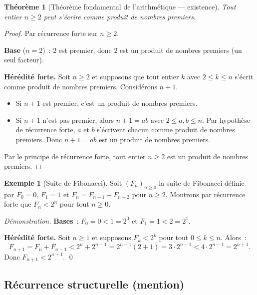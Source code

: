 \documentclass[12pt,a4paper,openany]{book}
\theoremstyle{definition}
\newtheorem{exemple}[definition]{Exemple}
\theoremstyle{plain}
\newtheorem{theoreme}[definition]{Théorème}
\theoremstyle{remark}
\begin{document}
\begin{theoreme}[Th\'eor\`eme fondamental de l'arithm\'etique --- existence]\label{thm:tfa-existence}
  Tout entier $n \geq 2$ peut s'\'ecrire comme produit de nombres premiers.
\end{theoreme}

\begin{proof}
  Par r\'ecurrence forte sur $n \geq 2$.

  \textbf{Base} ($n = 2$)~: $2$ est premier, donc $2$ est un produit de nombres premiers (un seul facteur). \checkmark

  \textbf{H\'er\'edit\'e forte.} Soit $n \geq 2$ et supposons que tout entier $k$ avec $2 \leq k \leq n$ s'\'ecrit comme produit de nombres premiers. Consid\'erons $n + 1$.
  \begin{itemize}
    \item Si $n + 1$ est premier, c'est un produit de nombres premiers. \checkmark
    \item Si $n + 1$ n'est pas premier, alors $n + 1 = ab$ avec $2 \leq a, b \leq n$. Par hypoth\`ese de r\'ecurrence forte, $a$ et $b$ s'\'ecrivent chacun comme produit de nombres premiers. Donc $n + 1 = ab$ est un produit de nombres premiers. \checkmark
  \end{itemize}
  Par le principe de r\'ecurrence forte, tout entier $n \geq 2$ est un produit de nombres premiers.
\end{proof}

\begin{exemple}[Suite de Fibonacci]\label{ex:fibonacci-rec-forte}
  Soit $(F_n)_{n \geq 0}$ la suite de Fibonacci d\'efinie par $F_0 = 0$, $F_1 = 1$ et $F_{n} = F_{n-1} + F_{n-2}$ pour $n \geq 2$. Montrons par r\'ecurrence forte que $F_n < 2^n$ pour tout $n \geq 0$.

  \smallskip
  \noindent\textit{D\'emonstration.}
  \textbf{Bases}~: $F_0 = 0 < 1 = 2^0$ et $F_1 = 1 < 2 = 2^1$. \checkmark

  \textbf{H\'er\'edit\'e forte.} Soit $n \geq 1$ et supposons $F_k < 2^k$ pour tout $0 \leq k \leq n$. Alors~:
  \[
    F_{n+1} = F_n + F_{n-1} < 2^n + 2^{n-1} = 2^{n-1}(2 + 1) = 3 \cdot 2^{n-1} < 4 \cdot 2^{n-1} = 2^{n+1}.
  \]
  Donc $F_{n+1} < 2^{n+1}$. \qed
\end{exemple}

\subsection{R\'ecurrence structurelle (mention)}
\label{subsec:recurrence-structurelle}
\end{document}
